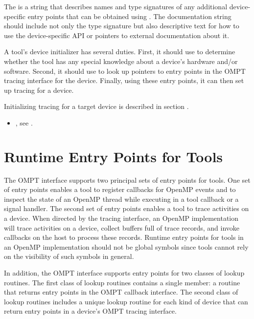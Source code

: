 The \callbackarg{}  is a string that describes names and type signatures
of any additional device-specific entry points that can be obtained
using . The documentation string should include
not only the type signature but also descriptive text for how to use
the device-specific API or pointers to external documentation about
it.

\effect

A tool's device initializer has several duties.  First, it should use
 to determine whether the tool has any special knowledge
about a device's hardware and/or software.  Second, it should use
 to look up pointers to entry points in the OMPT tracing
interface for the device.  Finally, using these entry points, it can
then set up tracing for a device.

Initializing tracing for a target device is described in section
. 

\crossreferences
\begin{itemize}
\item {}, see
  .
\end{itemize}

\section{Runtime Entry Points for Tools}
\label{sec:entry-points}

The OMPT interface supports two principal sets of entry points for tools. One
set of entry points enables a tool to register callbacks for OpenMP
events and to inspect the state of an OpenMP thread while
executing in a tool callback or a signal handler. The second set of entry points enables a
tool to trace activities on a device. When directed by the tracing
interface, an OpenMP implementation will trace activities on a device, collect
buffers full of trace records, and invoke callbacks on the host to
process these records. 
Runtime entry points for tools in an OpenMP implementation
should not be global symbols since tools cannot rely on the visibility
of such symbols in general.

In addition, the OMPT interface supports
entry points for two classes of lookup routines. The first
class of lookup routines contains a single member: a
routine that returns entry points in the OMPT callback interface. 
The second class of lookup routines includes 
a unique lookup routine for each kind of
device that can return entry points in a device's OMPT tracing interface.

